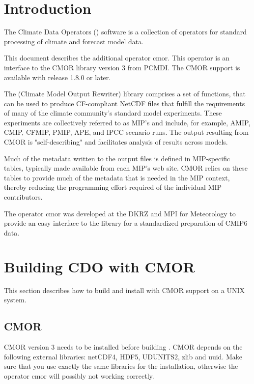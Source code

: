 \chapter{Introduction}

The Climate Data Operators ({\CDO}) software is a collection of operators
for standard processing of climate and forecast model data.

This document describes the additional {\CDO} operator cmor. This
operator is an interface to the CMOR library version 3 from PCMDI.
The CMOR support is available with {\CDO} release 1.8.0 or later.

The \cite{CMOR} (Climate Model Output Rewriter) library comprises a set of
functions, that can be used to produce CF-compliant NetCDF files that 
fulfill the requirements of many of the climate community's standard
model experiments. These experiments are collectively referred to as
MIP's and include, for example, AMIP, CMIP, CFMIP, PMIP, APE, and IPCC 
scenario runs. The output resulting from CMOR is "self-describing" and
facilitates analysis of results across models.

Much of the metadata written to the output files is defined in
MIP-specific tables, typically made available from each MIP's web
site. CMOR relies on these tables to provide much of the metadata 
that is needed in the MIP context, thereby reducing the programming 
effort required of the individual MIP contributors.

The  {\CDO} operator cmor was developed at the DKRZ and MPI for
Meteorology to provide an easy interface to the \cite{CMOR} library for a
standardized preparation of CMIP6 data.

\chapter{Building CDO with CMOR}

This section describes how to build and install {\CDO} with CMOR
support on a UNIX system.

\section{CMOR}
 
CMOR version 3 needs to be installed before building {\CDO}.
CMOR depends on the following external libraries:
netCDF4, HDF5, UDUNITS2, zlib and uuid.
Make sure that you use exactly the same libraries for the {\CDO}
installation, otherwise the operator cmor will possibly not working correctly.

